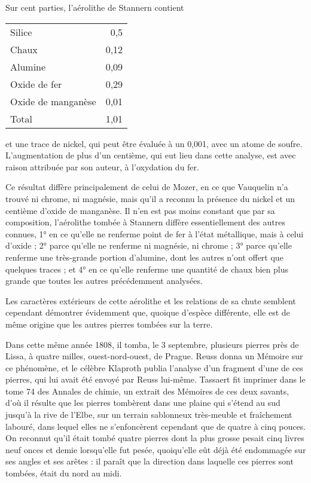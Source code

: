 \documentclass[a4paper, 12pt, oneside, french]{article}
\begin{document}
Sur cent parties, l'aérolithe de Stannern contient
\begin{table}[H]
    \centering
    \Fontauri
    \large
    \begin{tabular}{l r}
        Silice & 0,5 \\
        Chaux & 0,12 \\ 
        Alumine & 0,09 \\
        Oxide de fer & 0,29 \\
        Oxide de manganèse & 0,01 \\ \hline
        Total & 1,01 \\
    \end{tabular}
\end{table}
et une trace de nickel, qui peut être évaluée à un 0,001, avec un atome de soufre. L'augmentation de plus d'un centième, qui eut lieu dans cette analyse, est avec raison attribuée par son auteur, à l'oxydation du fer.

Ce résultat diffère principalement de celui de Mozer, en ce que Vauquelin n'a trouvé ni chrome, ni magnésie, mais qu'il a reconnu la présence du nickel et un centième d'oxide de manganèse. Il n'en est pas moins constant que par sa composition, l'aérolithe tombée à Stannern diffère essentiellement des autres connues, 1° en ce qu'elle ne renferme point de fer à l'état métallique, mais à celui d'oxide ; 2° parce qu'elle ne renferme ni magnésie, ni chrome ; 3° parce qu'elle renferme une très-grande portion d'alumine, dont les autres n'ont offert que quelques traces ; et 4° en ce qu'elle renferme une quantité de chaux bien plus grande que toutes les autres précédemment analysées.

Les caractères extérieurs de cette aérolithe et les relations de sa chute semblent cependant démontrer évidemment que, quoique d'espèce différente, elle est de même origine que les autres pierres tombées sur la terre.

Dans cette même année 1808, il tomba, le 3 septembre, plusieurs pierres près de Lissa, à quatre milles, ouest-nord-ouest, de Prague. Reuss donna un Mémoire sur ce phénomène, et le célèbre Klaproth publia l'analyse d'un fragment d'une de ces pierres, qui lui avait été envoyé par Reuss lui-même. Tassaert fit imprimer dans le tome 74 des Annales de chimie, un extrait des Mémoires de ces deux savants, d'où il résulte que les pierres tombèrent dans une plaine qui s'étend au sud jusqu'à la rive de l'Elbe, sur un terrain sablonneux très-meuble et fraîchement labouré, dans lequel elles ne s'enfoncèrent cependant que de quatre à cinq pouces. On reconnut qu'il était tombé quatre pierres dont la plus grosse pesait cinq livres neuf onces et demie lorsqu'elle fut pesée, quoiqu'elle eût déjà été endommagée sur ses angles et ses arêtes : il paraît que la direction dans laquelle ces pierres sont tombées, était du nord au midi.
\end{document}
